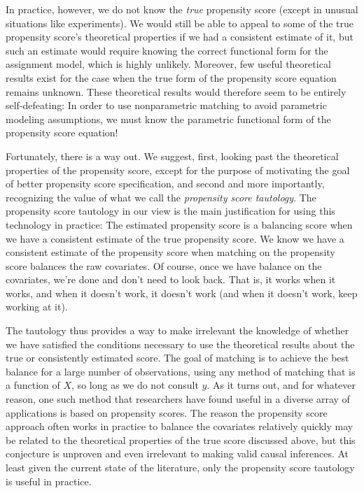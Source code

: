 \documentclass[11pt,titlepage]{article}
\begin{document}
In practice, however, we do not know the \emph{true} propensity score
(except in unusual situations like experiments).  We would still be
able to appeal to some of the true propensity score's theoretical
properties if we had a consistent estimate of it, but such an estimate
would require knowing the correct functional form for the assignment
model, which is highly unlikely.  Moreover, few useful theoretical
results exist for the case when the true form of the propensity score
equation remains unknown.  These theoretical results would therefore
seem to be entirely self-defeating: In order to use nonparametric
matching to avoid parametric modeling assumptions, we must know the
parametric functional form of the propensity score equation!

Fortunately, there is a way out.  We suggest, first, looking past the
theoretical properties of the propensity score, except for the purpose
of motivating the goal of better propensity score specification, and
second and more importantly, recognizing the value of what we call the
\emph{propensity score tautology}.  The propensity score tautology in
our view is the main justification for using this technology in
practice: The estimated propensity score is a balancing score when we
have a consistent estimate of the true propensity score.  We know we
have a consistent estimate of the propensity score when matching on
the propensity score balances the raw covariates.  Of course, once we
have balance on the covariates, we're done and don't need to look
back.  That is, it works when it works, and when it doesn't work, it
doesn't work (and when it doesn't work, keep working at it).

The tautology thus provides a way to make irrelevant the knowledge of
whether we have satisfied the conditions necessary to use the
theoretical results about the true or consistently estimated score.
The goal of matching is to achieve the best balance for a large number
of observations, using any method of matching that is a function of
$X$, so long as we do not consult $y$.  As it turns out, and for
whatever reason, one such method that researchers have found useful in
a diverse array of applications is based on propensity scores.  The
reason the propensity score approach often works in practice to
balance the covariates relatively quickly may be related to the
theoretical properties of the true score discussed above, but this
conjecture is unproven and even irrelevant to making valid causal
inferences.  At least given the current state of the literature, only
the propensity score tautology is useful in practice.
\end{document}
